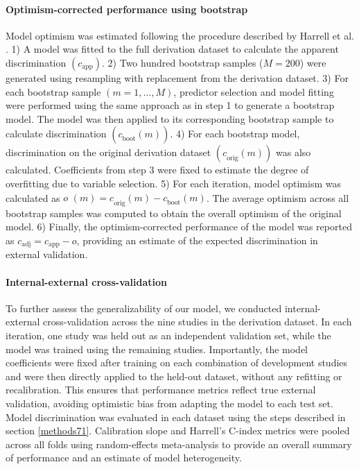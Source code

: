 \paragraph{Optimism-corrected performance using bootstrap}\label{methods72}
Model optimism was estimated following the procedure described by Harrell et al. \cite{Harrell1996Feb}. 1) A model was fitted to the full derivation dataset to calculate the apparent discrimination $(c_{\text{app}})$. 2) Two hundred bootstrap samples ($M=200$) were generated using resampling with replacement from the derivation dataset. 3) For each bootstrap sample $(m=1, \ldots, M)$, predictor selection and model fitting were performed using the same approach as in step 1 to generate a bootstrap model. The model was then applied to its corresponding bootstrap sample to calculate discrimination $(c_{\text{boot}}^{\phantom{(}}(m))$. 4) For each bootstrap model, discrimination on the original derivation dataset $(c_{\text{orig}}^{\phantom{(}}(m))$ was also calculated. Coefficients from step 3 were fixed to estimate the degree of overfitting due to variable selection. 5) For each iteration, model optimism was calculated as $o^{\phantom{(}}(m) = c_{\text{orig}}^{\phantom{(}}(m) - c_{\text{boot}}^{\phantom{(}}(m)$. The average optimism across all bootstrap samples was computed to obtain the overall optimism of the original model. 6) Finally, the optimism-corrected performance of the model was reported as $c_{\text{adj}} = c_{\text{app}} - o$, providing an estimate of the expected discrimination in external validation.


\paragraph{Internal-external cross-validation}\label{methods8}
To further assess the generalizability of our model, we conducted internal-external cross-validation across the nine studies in the derivation dataset. In each iteration, one study was held out as an independent validation set, while the model was trained using the remaining studies. Importantly, the model coefficients were fixed after training on each combination of development studies and were then directly applied to the held-out dataset, without any refitting or recalibration. This ensures that performance metrics reflect true external validation, avoiding optimistic bias from adapting the model to each test set. Model discrimination was evaluated in each dataset using the steps described in section \ref{methods71}. Calibration slope and Harrell's C-index metrics were pooled across all folds using random-effects meta-analysis to provide an overall summary of performance and an estimate of model heterogeneity.

